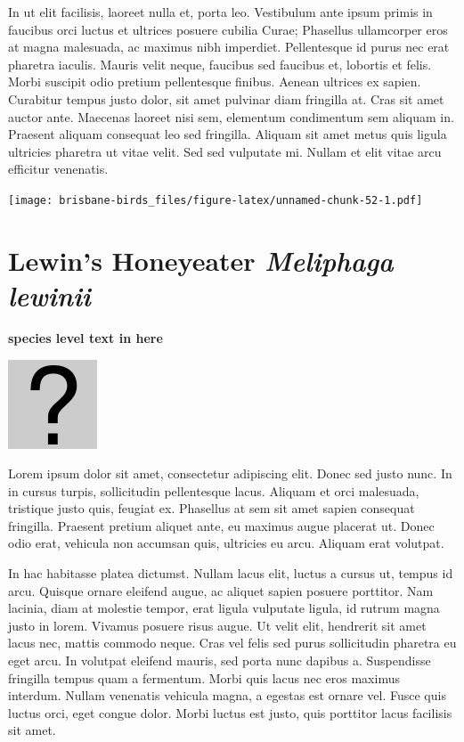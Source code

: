 \documentclass[]{book}
\let\origfigure\figure
\let\endorigfigure\endfigure
\renewenvironment{figure}[1][2] {
  \expandafter\origfigure\expandafter[H]
} {
  \endorigfigure
}
\begin{document}
In ut elit facilisis, laoreet nulla et, porta leo. Vestibulum ante ipsum
primis in faucibus orci luctus et ultrices posuere cubilia Curae;
Phasellus ullamcorper eros at magna malesuada, ac maximus nibh
imperdiet. Pellentesque id purus nec erat pharetra iaculis. Mauris velit
neque, faucibus sed faucibus et, lobortis et felis. Morbi suscipit odio
pretium pellentesque finibus. Aenean ultrices ex sapien. Curabitur
tempus justo dolor, sit amet pulvinar diam fringilla at. Cras sit amet
auctor ante. Maecenas laoreet nisi sem, elementum condimentum sem
aliquam in. Praesent aliquam consequat leo sed fringilla. Aliquam sit
amet metus quis ligula ultricies pharetra ut vitae velit. Sed sed
vulputate mi. Nullam et elit vitae arcu efficitur venenatis.

\begin{figure}
\centering
\texttt{[image: brisbane-birds\_files/figure-latex/unnamed-chunk-52-1.pdf]}
\caption{\label{fig:unnamed-chunk-52}insert figure caption}
\end{figure}

\section{\texorpdfstring{Lewin's Honeyeater \emph{Meliphaga
lewinii}}{Lewin's Honeyeater Meliphaga lewinii}}\label{lewins-honeyeater-meliphaga-lewinii}

\textbf{species level text in here}

\begin{figure}
\centering
\includegraphics{assets/missing.png}
\caption{No image for species}
\end{figure}

Lorem ipsum dolor sit amet, consectetur adipiscing elit. Donec sed justo
nunc. In in cursus turpis, sollicitudin pellentesque lacus. Aliquam et
orci malesuada, tristique justo quis, feugiat ex. Phasellus at sem sit
amet sapien consequat fringilla. Praesent pretium aliquet ante, eu
maximus augue placerat ut. Donec odio erat, vehicula non accumsan quis,
ultricies eu arcu. Aliquam erat volutpat.

In hac habitasse platea dictumst. Nullam lacus elit, luctus a cursus ut,
tempus id arcu. Quisque ornare eleifend augue, ac aliquet sapien posuere
porttitor. Nam lacinia, diam at molestie tempor, erat ligula vulputate
ligula, id rutrum magna justo in lorem. Vivamus posuere risus augue. Ut
velit elit, hendrerit sit amet lacus nec, mattis commodo neque. Cras vel
felis sed purus sollicitudin pharetra eu eget arcu. In volutpat eleifend
mauris, sed porta nunc dapibus a. Suspendisse fringilla tempus quam a
fermentum. Morbi quis lacus nec eros maximus interdum. Nullam venenatis
vehicula magna, a egestas est ornare vel. Fusce quis luctus orci, eget
congue dolor. Morbi luctus est justo, quis porttitor lacus facilisis sit
amet.
\end{document}
